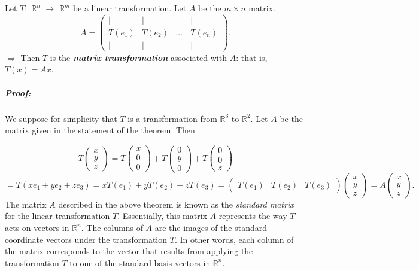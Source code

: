 \documentclass[a4paper,12pt]{article}
\begin{document}
\begin{tcolorbox}[title=Theorem (The matrix of a linear transformation),colframe=blue!70!black, colback=blue!5!white]
Let $T:$ \(\mathbb{R}^n\) $\rightarrow$ \(\mathbb{R}^m\) be a linear transformation. Let $A$ be the $m \times n$ matrix.
\[
A = \begin{pmatrix}
    | & | & \quad & | \\
    T(e_1) & T(e_2) & \dots & T(e_n) \\
    | & | & \quad & |
\end{pmatrix}.
\]
$\Rightarrow$ Then $T$ is the \textit{\textbf{matrix transformation}} associated with $A$: that is, $T(x)=Ax$.
\end{tcolorbox}

\subparagraph{Proof:}We suppose for simplicity that \( T \) is a transformation from \( \mathbb{R}^3 \) to \( \mathbb{R}^2 \). Let \( A \) be the matrix given in the statement of the theorem. Then

\[
T\begin{pmatrix} x \\ y \\ z \end{pmatrix}
= T\begin{pmatrix} x \\ 0 \\ 0 \end{pmatrix} + T\begin{pmatrix} 0 \\ y \\ 0 \end{pmatrix} + T\begin{pmatrix} 0 \\ 0 \\ z \end{pmatrix}
\]
\[
= T\left( x e_1 + y e_2 + z e_3 \right)
= x T(e_1) + y T(e_2) + z T(e_3)
= \begin{pmatrix} T(e_1) & T(e_2) & T(e_3) \end{pmatrix} \begin{pmatrix} x \\ y \\ z \end{pmatrix}
= A \begin{pmatrix} x \\ y \\ z \end{pmatrix}.
\] 
The matrix \( A \) described in the above theorem is known as the \textit{standard matrix} for the linear transformation \( T \). Essentially, this matrix \( A \) represents the way \( T \) acts on vectors in \( \mathbb{R}^n \). The columns of \( A \) are the images of the standard coordinate vectors under the transformation \( T \). In other words, each column of the matrix corresponds to the vector that results from applying the transformation \( T \) to one of the standard basis vectors in \( \mathbb{R}^n \).
\end{document}
